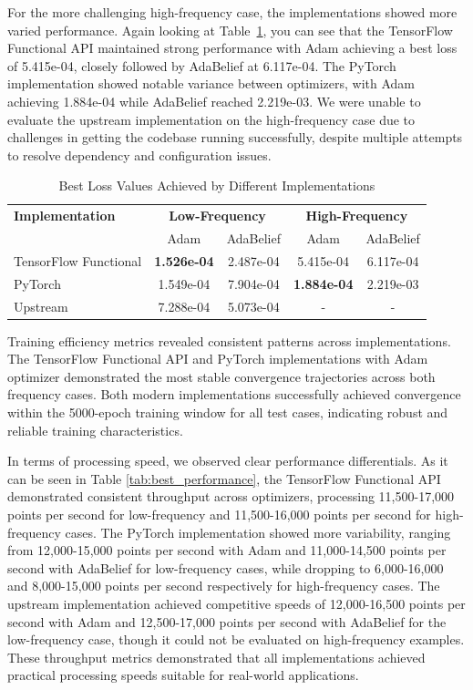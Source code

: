 \documentclass[10pt,journal,compsoc,onecolumn]{IEEEtran}
\begin{document}
For the more challenging high-frequency case, the implementations showed more varied performance. Again looking at Table~\ref{tab:best_loss}, you can see that the TensorFlow Functional API maintained strong performance with Adam achieving a best loss of 5.415e-04, closely followed by AdaBelief at 6.117e-04. The PyTorch implementation showed notable variance between optimizers, with Adam achieving 1.884e-04 while AdaBelief reached 2.219e-03. We were unable to evaluate the upstream implementation on the high-frequency case due to challenges in getting the codebase running successfully, despite multiple attempts to resolve dependency and configuration issues.

\begin{table}[htbp]
    \centering
    \caption{Best Loss Values Achieved by Different Implementations}
    \label{tab:best_loss}
    \begin{tabular}{lcccc}
        \hline
        \textbf{Implementation} & \multicolumn{2}{c}{\textbf{Low-Frequency}} & \multicolumn{2}{c}{\textbf{High-Frequency}} \\
        & Adam & AdaBelief & Adam & AdaBelief \\
        \hline
        TensorFlow Functional & \textbf{1.526e-04} & 2.487e-04 & 5.415e-04 & 6.117e-04 \\
        PyTorch & 1.549e-04 & 7.904e-04 & \textbf{1.884e-04} & 2.219e-03 \\
        Upstream & 7.288e-04 & 5.073e-04 & - & - \\
        \hline
    \end{tabular}
\end{table}

Training efficiency metrics revealed consistent patterns across implementations. The TensorFlow Functional API and PyTorch implementations with Adam optimizer demonstrated the most stable convergence trajectories across both frequency cases. Both modern implementations successfully achieved convergence within the 5000-epoch training window for all test cases, indicating robust and reliable training characteristics.

In terms of processing speed, we observed clear performance differentials. As it can be seen in Table \ref{tab:best_performance}, the TensorFlow Functional API demonstrated consistent throughput across optimizers, processing 11,500-17,000 points per second for low-frequency and 11,500-16,000 points per second for high-frequency cases. The PyTorch implementation showed more variability, ranging from 12,000-15,000 points per second with Adam and 11,000-14,500 points per second with AdaBelief for low-frequency cases, while dropping to 6,000-16,000 and 8,000-15,000 points per second respectively for high-frequency cases. The upstream implementation achieved competitive speeds of 12,000-16,500 points per second with Adam and 12,500-17,000 points per second with AdaBelief for the low-frequency case, though it could not be evaluated on high-frequency examples. These throughput metrics demonstrated that all implementations achieved practical processing speeds suitable for real-world applications.
\end{document}
